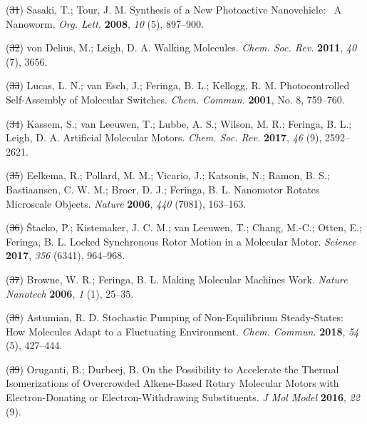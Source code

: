 \documentclass[11pt,notitlepage]{article}
\providecommand{\DIFaddtex}[1]{{\protect\color{blue}\uwave{#1}}} %
\providecommand{\DIFdeltex}[1]{{\protect\color{red}\sout{#1}}}                      %
\providecommand{\DIFaddbegin}{} %
\providecommand{\DIFaddend}{} %
\providecommand{\DIFdelbegin}{} %
\providecommand{\DIFdelend}{} %
\providecommand{\DIFadd}[1]{\texorpdfstring{\DIFaddtex{#1}}{#1}} %
\providecommand{\DIFdel}[1]{\texorpdfstring{\DIFdeltex{#1}}{}} %
\newcommand{\DIFscaledelfig}{0.5}
\newlength{\DIFdelgraphicswidth} %
\newlength{\DIFdelgraphicsheight} %
\newcommand{\DIFaddincludegraphics}[2][]{{\color{blue}\fbox{\DIFOincludegraphics[#1]{#2}}}} %
\newcommand{\DIFdelincludegraphics}[2][]{%
\sbox{\DIFdelgraphicsbox}{\DIFOincludegraphics[#1]{#2}}%
\settoboxwidth{\DIFdelgraphicswidth}{\DIFdelgraphicsbox} %
\settoboxtotalheight{\DIFdelgraphicsheight}{\DIFdelgraphicsbox} %
\scalebox{\DIFscaledelfig}{%
\parbox[b]{\DIFdelgraphicswidth}{\usebox{\DIFdelgraphicsbox}\\[-\baselineskip] \rule{\DIFdelgraphicswidth}{0em}}\llap{\resizebox{\DIFdelgraphicswidth}{\DIFdelgraphicsheight}{%
\setlength{\unitlength}{\DIFdelgraphicswidth}%
\begin{picture}(1,1)%
\thicklines\linethickness{2pt} %
{\color[rgb]{1,0,0}\put(0,0){\framebox(1,1){}}}%
{\color[rgb]{1,0,0}\put(0,0){\line( 1,1){1}}}%
{\color[rgb]{1,0,0}\put(0,1){\line(1,-1){1}}}%
\end{picture}%
}\hspace*{3pt}}} %
} %
\DeclareRobustCommand{\DIFaddbegin}{\DIFOaddbegin \let\includegraphics\DIFaddincludegraphics} %
\DeclareRobustCommand{\DIFaddend}{\DIFOaddend \let\includegraphics\DIFOincludegraphics} %
\DeclareRobustCommand{\DIFdelbegin}{\DIFOdelbegin \let\includegraphics\DIFdelincludegraphics} %
\DeclareRobustCommand{\DIFdelend}{\DIFOaddend \let\includegraphics\DIFOincludegraphics} %
\begin{document}
\leavevmode\hypertarget{ref-Tels98bO}{}%
(\DIFdelbegin \DIFdel{31}\DIFdelend \DIFaddbegin \DIFadd{39}\DIFaddend ) Sasaki, T.; Tour, J. M. Synthesis of a New Photoactive
Nanovehicle:~ A Nanoworm. \emph{Org. Lett.} \textbf{2008}, \emph{10}
(5), 897--900.

\leavevmode\hypertarget{ref-SfUEsk0e}{}%
(\DIFdelbegin \DIFdel{32}\DIFdelend \DIFaddbegin \DIFadd{40}\DIFaddend ) von Delius, M.; Leigh, D. A. Walking Molecules. \emph{Chem. Soc.
Rev.} \textbf{2011}, \emph{40} (7), 3656.

\leavevmode\hypertarget{ref-jCuccJLJ}{}%
(\DIFdelbegin \DIFdel{33}\DIFdelend \DIFaddbegin \DIFadd{41}\DIFaddend ) Lucas, L. N.; van Esch, J.; Feringa, B. L.; Kellogg, R. M.
Photocontrolled Self-Assembly of Molecular Switches. \emph{Chem.
Commun.} \textbf{2001}, No. 8, 759--760.

\leavevmode\hypertarget{ref-1H5r7SBir}{}%
(\DIFdelbegin \DIFdel{34}\DIFdelend \DIFaddbegin \DIFadd{42}\DIFaddend ) Kassem, S.; van Leeuwen, T.; Lubbe, A. S.; Wilson, M. R.; Feringa,
B. L.; Leigh, D. A. Artificial Molecular Motors. \emph{Chem. Soc. Rev.}
\textbf{2017}, \emph{46} (9), 2592--2621.

\leavevmode\hypertarget{ref-thFGBz32}{}%
(\DIFdelbegin \DIFdel{35}\DIFdelend \DIFaddbegin \DIFadd{43}\DIFaddend ) Eelkema, R.; Pollard, M. M.; Vicario, J.; Katsonis, N.; Ramon, B.
S.; Bastiaansen, C. W. M.; Broer, D. J.; Feringa, B. L. Nanomotor
Rotates Microscale Objects. \emph{Nature} \textbf{2006}, \emph{440}
(7081), 163--163.

\leavevmode\hypertarget{ref-mKSNFvW7}{}%
(\DIFdelbegin \DIFdel{36}\DIFdelend \DIFaddbegin \DIFadd{44}\DIFaddend ) Štacko, P.; Kistemaker, J. C. M.; van Leeuwen, T.; Chang, M.-C.;
Otten, E.; Feringa, B. L. Locked Synchronous Rotor Motion in a Molecular
Motor. \emph{Science} \textbf{2017}, \emph{356} (6341), 964--968.

\leavevmode\hypertarget{ref-10FsKpWBI}{}%
(\DIFdelbegin \DIFdel{37}\DIFdelend \DIFaddbegin \DIFadd{45}\DIFaddend ) Browne, W. R.; Feringa, B. L. Making Molecular Machines Work.
\emph{Nature Nanotech} \textbf{2006}, \emph{1} (1), 25--35.

\leavevmode\hypertarget{ref-qhUBHBOM}{}%
(\DIFdelbegin \DIFdel{38}\DIFdelend \DIFaddbegin \DIFadd{46}\DIFaddend ) Astumian, R. D. Stochastic Pumping of Non-Equilibrium
Steady-States: How Molecules Adapt to a Fluctuating Environment.
\emph{Chem. Commun.} \textbf{2018}, \emph{54} (5), 427--444.

\leavevmode\hypertarget{ref-1AzLiBVkC}{}%
(\DIFdelbegin \DIFdel{39}\DIFdelend \DIFaddbegin \DIFadd{47}\DIFaddend ) Oruganti, B.; Durbeej, B. On the Possibility to Accelerate the
Thermal Isomerizations of Overcrowded Alkene-Based Rotary Molecular
Motors with Electron-Donating or Electron-Withdrawing Substituents.
\emph{J Mol Model} \textbf{2016}, \emph{22} (9).
\end{document}
